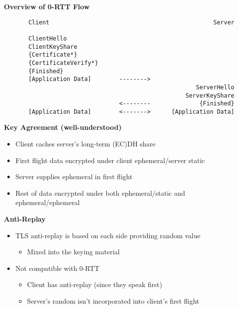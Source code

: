 \documentclass[helvetica]{seminar}
\newcommand{\heading}[1]{%
  \begin{center} 
    \large\bf 
    #1 
  \end{center} 
  \vspace{.4 in}}
\begin{document}
\begin{slide}
\heading{Overview of 0-RTT Flow}

{\scriptsize
\begin{verbatim}
       Client                                               Server

       ClientHello
       ClientKeyShare
       {Certificate*}
       {CertificateVerify*}
       {Finished}              
       [Application Data]        -------->
                                                       ServerHello
                                                    ServerKeyShare
                                 <--------              {Finished}
       [Application Data]        <------->      [Application Data]
\end{verbatim}
}
\end{slide}


\begin{slide}
\heading{Key Agreement (well-understood)}

\begin{itemize}
\item Client caches server's long-term (EC)DH share
\item First flight data encrypted under client ephemeral/server static
\item Server supplies ephemeral in first flight
\item Rest of data encrypted under both ephemeral/static and ephemeral/ephemeral
\end{itemize}
\end{slide}


\begin{slide}
\heading{Anti-Replay}

\begin{itemize}
\item TLS anti-replay is based on each side providing random value
  \begin{itemize}
  \item Mixed into the keying material
  \end{itemize}

\item Not compatible with 0-RTT
  \begin{itemize}
  \item Client has anti-replay (since they speak first)
  \item Server's random isn't incorporated into client's first flight
  \end{itemize}
\end{itemize}
\end{slide}
\end{document}
